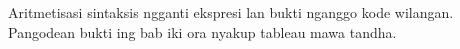 \documentclass[../../../include/open-logic-chapter]{subfiles}
\begin{document}

\begin{editorial}
Aritmetisasi sintaksis ngganti ekspresi lan bukti nganggo kode wilangan. Pangodean bukti ing bab iki ora nyakup tableau mawa tandha.
\end{editorial}









\OLEndChapterHook
\end{document}
